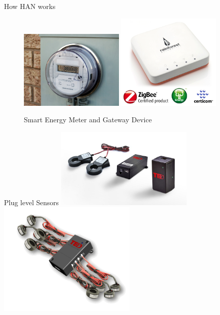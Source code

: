 \documentclass[xcolor=svgnames,handout]{beamer}
\begin{document}
    \begin{frame}
      {How HAN works}

      \begin{figure}[t]
        \centering
\includegraphics[width=0.45\textwidth]{Smart-Meters1}
\hfill
\includegraphics[width=0.45\textwidth]{eagle-picture}
        \caption{Smart Energy Meter and Gateway Device}
      \end{figure}
    \end{frame}


    \begin{frame}
      {Plug level Sensors}
      \includegraphics[width=0.5\textwidth]{package_wo_handset}
      \includegraphics[width=0.5\textwidth]{spyder}
    \end{frame}
\end{document}
